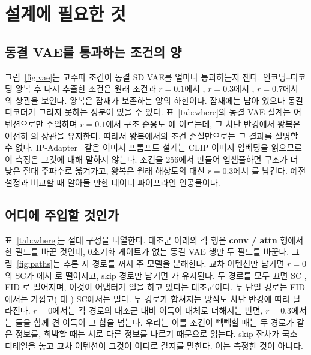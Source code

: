 \documentclass[10pt,twocolumn,a4paper]{article}
\begin{document}
\section{설계에 필요한 것}
\label{sec:design}

\subsection{동결 VAE를 통과하는 조건의 양}
\label{sec:vae}



그림~\ref{fig:vae}는 고주파 조건이 동결 SD VAE를 얼마나 통과하는지 잰다. 인코딩--디코딩
왕복 후 다시 추출한 조건은 원래 조건과 $r{=}0.1$에서 \vaeNativeOneZero{}, $r{=}0.3$에서
\vaeNativeThreeZero{}, $r{=}0.7$에서 \vaeNativeSevenZero{}의 상관을 보인다. 왕복은 잠재가
보존하는 양의 하한이다. 잠재에는 남아 있으나 동결 디코더가 그리지 못하는 성분이 있을 수
있다. 표~\ref{tab:where}의 동결 VAE 설계는 어텐션으로만 주입하며 $r{=}0.1$에서 구조 순응도
\scEgateOneZero{}에 이르는데, 그 차단 반경에서 왕복은 여전히 \vaeNativeOneZero{}의 상관을
유지한다. 따라서 왕복에서의 조건 손실만으로는 그 결과를 설명할 수 없다.
IP-Adapter~\cite{ye2023adapter} 같은 이미지 프롬프트 설계는 CLIP 이미지 임베딩을 읽으므로 이
측정은 그것에 대해 말하지 않는다. 조건을 256에서 만들어 업샘플하면 구조가 더 낮은 절대
주파수로 옮겨가고, 왕복은 원래 해상도의 \vaeNativeThreeZero{} 대신 $r{=}0.3$에서
\vaeUpThreeZero{}를 남긴다. 예전 설정과 비교할 때 알아둘 만한 데이터 파이프라인
인공물이다.

\subsection{어디에 주입할 것인가}
\label{sec:where}



표~\ref{tab:where}는 절대 구성을 나열한다. 대조군 아래의 각 행은 \textbf{conv / attn}
행에서 한 필드를 바꾼 것인데, 0초기화 게이트가 없는 동결 VAE 행만 두 필드를 바꾼다. 그림~\ref{fig:paths}는 추론 시 경로를 꺼서 주 모델을 분해한다. 교차
어텐션만 남기면 $r{=}0$의 SC가 \pathBothZero{}에서 \pathAttnOnlyZero{}로 떨어지고, skip
경로만 남기면 \pathSkipOnlyZero{}가 유지된다. 두 경로를 모두 끄면 SC \pathAllOffZero{},
FID \pathFidAllOff{}로 떨어지며, 이것이 어댑터가 일을 하고 있다는 대조군이다. 두 단일
경로는 FID에서는 가깝고(\pathFidSkipOnly{} 대 \pathFidAttnOnly{}) SC에서는 멀다. 두 경로가
합쳐지는 방식도 차단 반경에 따라 달라진다. $r{=}0$에서는 각 경로의 대조군 대비 이득이 대체로
더해지는 반면, $r{=}0.3$에서는 둘을 함께 켠 이득이 그 합을 넘는다. 우리는 이를 조건이 빽빽할
때는 두 경로가 같은 정보를, 희박할 때는 서로 다른 정보를 나르기 때문으로 읽는다. skip 잔차가
국소 디테일을 놓고 교차 어텐션이 그것이 어디로 갈지를 말한다. 이는 측정한 것이 아니다.
\end{document}
